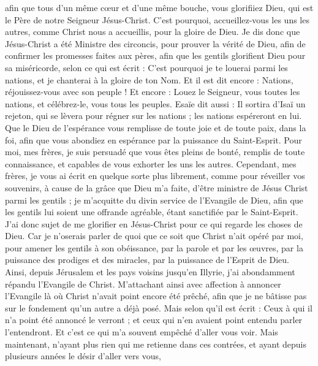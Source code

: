 \begin{multicols}{2}
afin que tous d'un même cœur et d'une même bouche, vous glorifiiez Dieu, qui est le Père de notre Seigneur Jésus-Christ.
C'est pourquoi, accueillez-vous les uns les autres, comme Christ nous a accueillis, pour la gloire de Dieu.
Je dis donc que Jésus-Christ a été Ministre des circoncis, pour prouver la vérité de Dieu, afin de confirmer les promesses faites aux pères,
afin que les gentils glorifient Dieu pour sa miséricorde, selon ce qui est écrit : C’est pourquoi je te louerai parmi les nations, et je chanterai à la gloire de ton Nom. Et il est dit encore :
Nations, réjouissez-vous avec son peuple !
Et encore : Louez le Seigneur, vous toutes les nations, et célébrez-le, vous tous les peuples. Esaïe dit aussi :
Il sortira d’Isaï un rejeton, qui se lèvera pour régner sur les nations ; les nations espéreront en lui.
Que le Dieu de l’espérance vous remplisse de toute joie et de toute paix, dans la foi, afin que vous abondiez en espérance par la puissance du Saint-Esprit.
Pour moi, mes frères, je suis persuadé que vous êtes pleins de bonté, remplis de toute connaissance, et capables de vous exhorter les uns les autres.
Cependant, mes frères, je vous ai écrit en quelque sorte plus librement, comme pour réveiller vos souvenirs, à cause de la grâce que Dieu m’a faite,
d’être ministre de Jésus Christ parmi les gentils ; je m’acquitte du divin service de l'Evangile de Dieu, afin que les gentils lui soient une offrande agréable, étant sanctifiée par le Saint-Esprit.
J'ai donc sujet de me glorifier en Jésus-Christ pour ce qui regarde les choses de Dieu.
Car je n’oserais parler de quoi que ce soit que Christ n’ait opéré par moi, pour amener les gentils à son obéissance, par la parole et par les œuvres,
par la puissance des prodiges et des miracles, par la puissance de l'Esprit de Dieu. Ainsi, depuis Jérusalem et les pays voisins jusqu’en Illyrie, j’ai abondamment répandu l’Evangile de Christ.
M'attachant ainsi avec affection à annoncer l’Evangile là où Christ n’avait point encore été prêché, afin que je ne bâtisse pas sur le fondement qu'un autre a déjà posé. 
Mais selon qu'il est écrit : Ceux à qui il n'a point été annoncé le verront ; et ceux qui n'en avaient point entendu parler l’entendront.
Et c’est ce qui m'a souvent empêché d’aller vous voir.
Mais maintenant, n’ayant plus rien qui me retienne dans ces contrées, et ayant depuis plusieurs années le désir d’aller vers vous,

\end{multicols}
